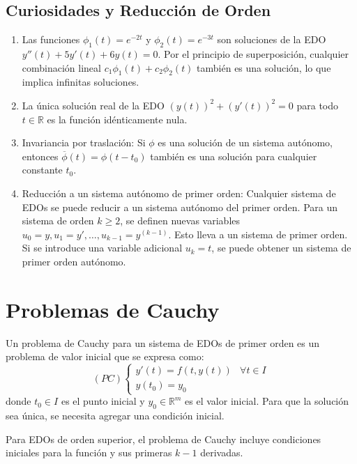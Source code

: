 \subsection{Curiosidades y Reducción de Orden}

\begin{enumerate}
    \item Las funciones $\phi_1(t) = e^{-2t}$ y $\phi_2(t) = e^{-3t}$ son soluciones de la EDO $y''(t) + 5y'(t) + 6y(t) = 0$. Por el principio de superposición, cualquier combinación lineal $c_1\phi_1(t) + c_2\phi_2(t)$ también es una solución, lo que implica infinitas soluciones.
    \item La única solución real de la EDO $(y(t))^2 + (y'(t))^2 = 0$ para todo $t \in \mathbb{R}$ es la función idénticamente nula.
    \item Invariancia por traslación: Si $\phi$ es una solución de un sistema autónomo, entonces $\overline{\phi}(t) = \phi(t-t_0)$ también es una solución para cualquier constante $t_0$.
    \item Reducción a un sistema autónomo de primer orden: Cualquier sistema de EDOs se puede reducir a un sistema autónomo del primer orden. Para un sistema de orden $k \ge 2$, se definen nuevas variables $u_0=y, u_1=y', \dots, u_{k-1}=y^{(k-1)}$. Esto lleva a un sistema de primer orden. Si se introduce una variable adicional $u_k = t$, se puede obtener un sistema de primer orden autónomo.
\end{enumerate}

\section{Problemas de Cauchy}

\begin{definition}
Un problema de Cauchy para un sistema de EDOs de primer orden es un problema de valor inicial que se expresa como:
$$(PC) \begin{cases} y'(t) = f(t, y(t)) & \forall t \in I \\ y(t_0) = y_0 \end{cases}$$
donde $t_0 \in I$ es el punto inicial y $y_0 \in \mathbb{R}^m$ es el valor inicial. Para que la solución sea única, se necesita agregar una condición inicial.
\end{definition}

Para EDOs de orden superior, el problema de Cauchy incluye condiciones iniciales para la función y sus primeras $k-1$ derivadas.

